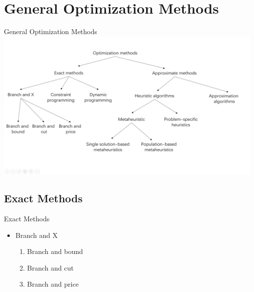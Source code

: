 \section{General Optimization Methods}

    \begin{frame}{General Optimization Methods}
        \centering
        \includegraphics[width = 1\textwidth]{images/opt.png}
    \end{frame}

    \subsection{Exact Methods}
    \frame{\sectionpage}

    \begin{frame}{Exact Methods}
      \Large
      \begin{spacing}{2}
        \begin{itemize}
          \item<+-> Branch and X
            \begin{enumerate}
            \item<+>  Branch and bound
            \item<+>  Branch and cut
            \item<+>  Branch and price
            \end{enumerate}
        \end{itemize}
      \end{spacing}
    \end{frame}

